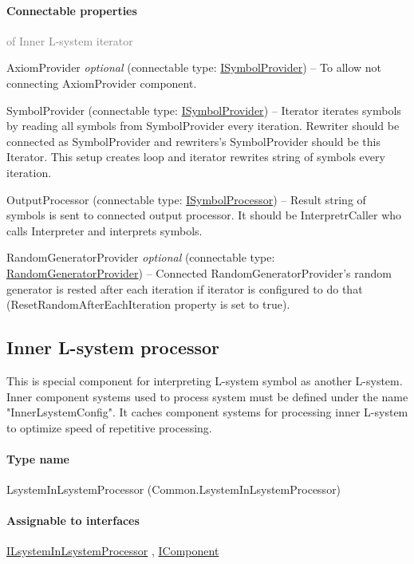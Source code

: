 	\paragraph{Connectable properties}\textcolor{gray}{of Inner L-system iterator}
	\begin{description*}
		\item[AxiomProvider]
 \textit{optional} 		(connectable type:  \hyperref[Malsys.Processing.Components.ISymbolProvider]{ISymbolProvider})
			-- To allow not connecting AxiomProvider component.
		\item[SymbolProvider]
		(connectable type:  \hyperref[Malsys.Processing.Components.ISymbolProvider]{ISymbolProvider})
			-- Iterator iterates symbols by reading all symbols from SymbolProvider every iteration.
            Rewriter should be connected as SymbolProvider and rewriters's SymbolProvider should be this Iterator.
            This setup creates loop and iterator rewrites string of symbols every iteration.
		\item[OutputProcessor]
		(connectable type:  \hyperref[Malsys.Processing.Components.ISymbolProcessor]{ISymbolProcessor})
			-- Result string of symbols is sent to connected output processor.
            It should be InterpretrCaller who calls Interpreter and interprets symbols.
		\item[RandomGeneratorProvider]
 \textit{optional} 		(connectable type:  \hyperref[Malsys.Processing.Components.Common.RandomGeneratorProvider]{RandomGeneratorProvider})
			-- Connected RandomGeneratorProvider's random generator is rested after each iteration
            if iterator is configured to do that (ResetRandomAfterEachIteration property is set to true).
	\end{description*}
	


\subsection{Inner L-system processor}
\label{Malsys.Processing.Components.Common.LsystemInLsystemProcessor}
This is special component for interpreting L-system symbol as another L-system.
            Inner component systems used to process system must be defined under the name "InnerLsystemConfig".
            It caches component systems for processing inner L-system to optimize speed of repetitive processing.\paragraph{Type name}
LsystemInLsystemProcessor (Common.LsystemInLsystemProcessor) 	\paragraph{Assignable to interfaces}
		\hyperref[Malsys.Processing.Components.Common.ILsystemInLsystemProcessor]{ILsystemInLsystemProcessor}%
, 		\hyperref[Malsys.Processing.Components.IComponent]{IComponent}%
	
